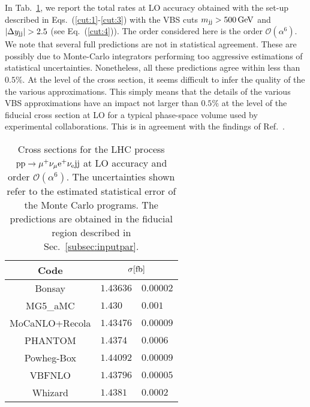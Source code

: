 In Tab.~\ref{tab:wg1_LOrates}, we report the total rates at LO accuracy obtained with the set-up described in Eqs.~(\ref{cut:1}-\ref{cut:3}) with the VBS cuts $m_{\text{j}\text{j}} > 500 \,\text{GeV}$ and $|\Delta y_{\text{j}\text{j}}| > 2.5$ (see Eq.~(\ref{cut:4})).
The order considered here is the order $\mathcal{O}(\alpha^6)$.
We note that several full predictions are not in statistical agreement. These are possibly due to Monte-Carlo 
integrators performing too aggressive estimations of statistical uncertainties. Nonetheless, all these predictions agree within less than $0.5\%$.
At the level of the cross section, it seems difficult to infer the quality of the the various approximations.
This simply means that the details of the various VBS approximations have an impact not larger than $0.5\%$ at 
the level of the fiducial cross section at LO for a typical phase-space volume used by experimental collaborations. This is in agreement with the findings of Ref.~\cite{Denner:2012dz,Oleari:2003tc}.

\begin{table}[h!]
    \centering
    \begin{tabular}{c|r@{ $\pm$ }l}
      Code  &  \multicolumn{2}{c}{$\sigma[\rm{fb}]$}  \\
        \hline
        \hline
        {\sc Bonsay}  &  $1.43636$ & $0.00002$ \\
        {\sc MG5\_aMC}&  $1.430\phantom{0}\phantom{0}$ & $0.001$ \\
        {\sc MoCaNLO+Recola}  &  $1.43476$ & $0.00009$ \\
        {\sc PHANTOM} &  $1.4374\phantom{0}$ & $0.0006 $  \\
        {\sc Powheg-Box}  &  $1.44092$ & $0.00009$ \\
        {\sc VBFNLO}  &  $1.43796$ & $0.00005$ \\
        {\sc Whizard} &  $1.4381\phantom{0}$ & $0.0002 $
    \end{tabular}
    \caption{\label{tab:wg1_LOrates} Cross sections for the LHC process ${\rm p}{\rm p}\to\mu^+\nu_\mu{\rm e}^+\nu_{\rm e}{\rm j}{\rm j}$ at LO accuracy and order $\mathcal{O}(\alpha^6)$.
    The uncertainties shown refer to the estimated statistical error of the Monte Carlo programs.
    The predictions are obtained in the fiducial region described in Sec.~\ref{subsec:inputpar}.
    }
\end{table}
